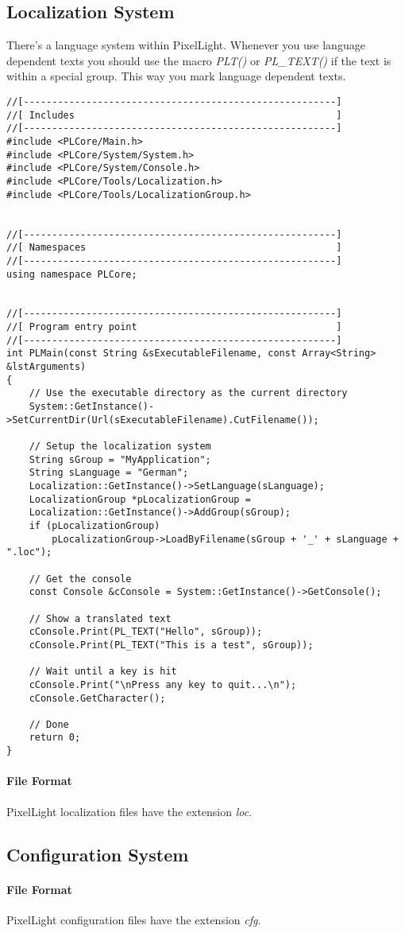 \subsection{Localization System}
There's a language system within PixelLight. Whenever you use language dependent texts you should use the macro \emph{PLT()} or \emph{PL\_TEXT()} if the text is within a special group. This way you mark language dependent texts.

\begin{lstlisting}[caption=Localization usage example]
//[-------------------------------------------------------]
//[ Includes                                              ]
//[-------------------------------------------------------]
#include <PLCore/Main.h>
#include <PLCore/System/System.h>
#include <PLCore/System/Console.h>
#include <PLCore/Tools/Localization.h>
#include <PLCore/Tools/LocalizationGroup.h>


//[-------------------------------------------------------]
//[ Namespaces                                            ]
//[-------------------------------------------------------]
using namespace PLCore;


//[-------------------------------------------------------]
//[ Program entry point                                   ]
//[-------------------------------------------------------]
int PLMain(const String &sExecutableFilename, const Array<String> &lstArguments)
{
	// Use the executable directory as the current directory
	System::GetInstance()->SetCurrentDir(Url(sExecutableFilename).CutFilename());

	// Setup the localization system
	String sGroup = "MyApplication";
	String sLanguage = "German";
	Localization::GetInstance()->SetLanguage(sLanguage);
	LocalizationGroup *pLocalizationGroup =
	Localization::GetInstance()->AddGroup(sGroup);
	if (pLocalizationGroup)
		pLocalizationGroup->LoadByFilename(sGroup + '_' + sLanguage + ".loc");

	// Get the console
	const Console &cConsole = System::GetInstance()->GetConsole();

	// Show a translated text
	cConsole.Print(PL_TEXT("Hello", sGroup));
	cConsole.Print(PL_TEXT("This is a test", sGroup));

	// Wait until a key is hit
	cConsole.Print("\nPress any key to quit...\n");
	cConsole.GetCharacter();

	// Done
	return 0;
}
\end{lstlisting}


\paragraph{File Format}
PixelLight localization files have the extension \emph{loc}.




\subsection{Configuration System}


\paragraph{File Format}
PixelLight configuration files have the extension \emph{cfg}.
